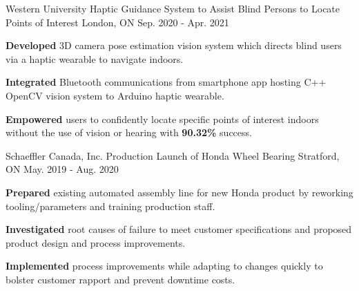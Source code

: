 

\begin{cventries}

  \cventry
    {Western University} %
    {Haptic Guidance System to Assist Blind Persons to Locate Points of Interest} %
    {London, ON} %
    {Sep. 2020 - Apr. 2021} %
    {
      \begin{cvitems} %
        \item {\textbf{Developed} 3D camera pose estimation vision system which directs blind users via a haptic wearable to navigate indoors.}
        \item {\textbf{Integrated} Bluetooth communications from smartphone app hosting C++ OpenCV vision system to Arduino haptic wearable.}
        \item {\textbf{Empowered} users to confidently locate specific points of interest indoors without the use of vision or hearing with \textbf{90.32\%} success.}
      \end{cvitems}
    }

\cventry
{Schaeffler Canada, Inc.} %
{Production Launch of Honda Wheel Bearing } %
{Stratford, ON} %
{May. 2019 - Aug. 2020} %
{
  \begin{cvitems} %
    \item {\textbf{Prepared} existing automated assembly line for new Honda product by reworking tooling/parameters and training production staff.}
    \item {\textbf{Investigated} root causes of failure to meet customer specifications and proposed product design and process improvements.}
    \item {\textbf{Implemented} process improvements while adapting to changes quickly to bolster customer rapport and prevent downtime costs.}
  \end{cvitems}
}

\end{cventries}
